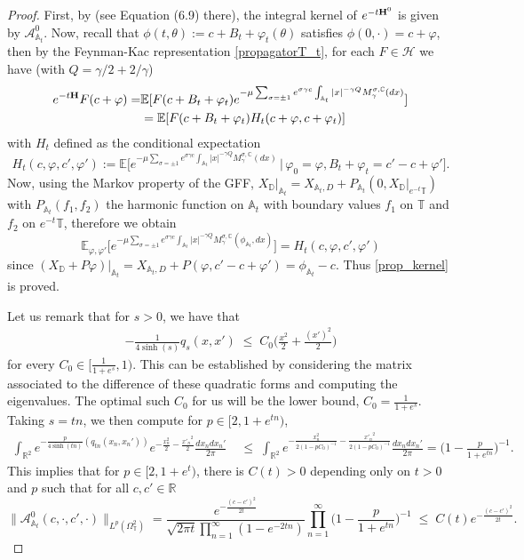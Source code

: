\documentclass[11pt]{amsart}
\numberwithin{equation}{section}
\theoremstyle{definition}
\renewcommand{\leq}{\;\leqslant\;}                   %
\newcommand{\C}{\mathbb{C}}
\newcommand{\A}{\mathbb{A}}
\newcommand{\D}{\mathbb{D}}
\newcommand{\R}{\mathbb{R}}
\def\E{\mathbb{E}}
\newcommand{\mc}{\mathcal}
\def\T{\mathbb{T}}
\begin{document}
\begin{proof} First, by \cite[Proposition 6.1]{GKRV21_Segal} (see Equation (6.9) there), the integral kernel of $e^{-t{\bf H}^0}$ is given by $\mc{A}^0_{\A_t}$. Now, recall that $\phi(t,\theta):=c+B_t+\varphi_t(\theta)$ satisfies $\phi(0,\cdot)=c+\varphi$, then by the Feynman-Kac representation \eqref{propagatorT_t}, for each $F\in \mc{H}$ we have (with $Q=\gamma/2+2/\gamma$)
\[\begin{split} 
e^{-t{\bf H}}F(c+\varphi)=&\E[ F(c+B_t+\varphi_t)e^{-\mu\sum_{\sigma = \pm 1}e^{\sigma \gamma c}\int_{\A_t}|x|^{-\gamma Q}M_{\gamma}^{\sigma,\C}(dx)}]\\
& = \E[ F(c+B_t+\varphi_t)H_t(c+\varphi,c+ \varphi_t)]
\end{split}
\]
with $H_t$ defined as the conditional expectation
\[ H_t(c,\varphi,c',\varphi'):=\E\Big[ e^{-\mu\sum_{\sigma = \pm 1}e^{\sigma \gamma c}\int_{\A_t}|x|^{-\gamma Q}M_{\gamma}^{\sigma,\C}(dx) }\,\Big |\, \varphi_0=\varphi, B_t+\varphi_t=c'-c+\varphi'\Big].\]
Now, using the Markov property of the GFF, $X_\D|_{\A_t}=X_{\A_t,D}+P_{\A_t}(0,X_\D|_{e^{-t}\T})$ with $P_{\A_t}(f_1,f_2)$ the harmonic function on $\A_t$ with boundary values $f_1$ on $\T$ and $f_2$ on $e^{-t}\T$, therefore
we obtain
\[\E_{\varphi,\varphi'}\Big[e^{-\mu \sum_{\sigma=\pm 1}e^{\sigma \gamma c}\int_{\A_t}|x|^{-\gamma Q}M_{\gamma}^{\sigma,\C}(\phi_{\A_t},dx)}\Big]=H_t(c,\varphi,c',\varphi') \]
since $(X_\D+P\varphi)|_{\A_t}=X_{\A_t,D}+P(\varphi,c'-c+\varphi')=\phi_{\A_t}-c$. Thus \eqref{prop_kernel} is proved. 

Let us remark that for $s>0$, we have that
\begin{align*}
-\frac{1}{4\sinh(s)}q_{s}(x,x')\leq C_0 \Big( \frac{x^2}{2}+\frac{(x')^2}2 \Big)
\end{align*}
for every $C_0\in[\frac{1}{1+e^{s}},1)$. This can be established by considering the matrix associated to the difference of these quadratic forms and computing the eigenvalues. The optimal such $C_0$ for us will be the lower bound, $C_0= \frac{1}{1+e^s}$. Taking $s=tn$, we then compute for $p \in [2, 1+ e^{tn})$,  
\begin{align*}
\int_{\R^2} e^{-\frac{p}{4\sinh(tn)}(q_{tn}(x_n,x_n'))}e^{-\frac{x_n^2}{2}-\frac{{x'_n}^2}{2}}\frac{dx_ndx_n'}{2\pi}
&\leq
\int_{\R^2} e^{-\frac{x_n^2}{2(1-pC_0)^{-1}}-\frac{{x'_n}^2}{2(1-pC_0)^{-1}}}\frac{dx_ndx_n'}{2\pi}
=
\Big(1-\frac{p}{1+e^{tn}}\Big)^{-1}.
\end{align*}
This implies that for $p\in [2,1+e^{t})$, there is $C(t)>0$ depending only on $t>0$ and $p$ such that for all $c,c'\in \R$ 
\begin{equation}\label{boundL^2A0}
 \|\mc{A}^0_{\A_t}(c,\cdot,c',\cdot)\|_{L^p(\Omega_\T^2)}=\frac{e^{-\frac{(c-c')^2}{2t}}}{\sqrt{2\pi t}\prod_{n=1}^\infty(1-e^{-2tn})}\prod_{n=1}^\infty\Big(1-\frac{p}{1+e^{tn}}\Big)^{-1}\leq C(t)e^{-\frac{(c-c')^2}{2t}}.
\end{equation}






\end{proof}
\end{document}
